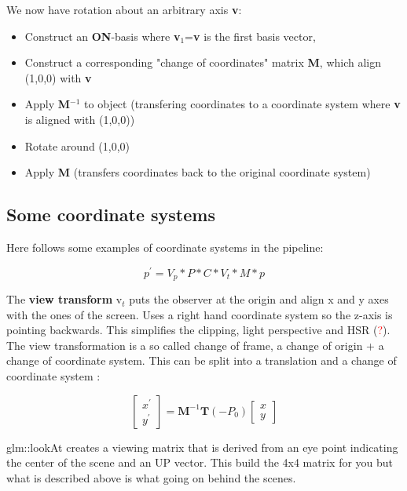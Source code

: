 	\noindent We now have rotation about an arbitrary axis \textbf{v}:

		\begin{itemize}
			\item Construct an \textbf{ON}-basis where \textbf{v}$_1$=\textbf{v} is the first basis vector, 
			\item Construct a corresponding "change of coordinates" matrix \textbf{M}, which align (1,0,0) with \textbf{v}
			\item Apply \textbf{M}$^{-1}$ to object (transfering coordinates to a coordinate system where \textbf{v} is aligned with (1,0,0))
			\item Rotate around (1,0,0)
			\item Apply \textbf{M} (transfers coordinates back to the original coordinate system)
		\end{itemize}

		\subsection*{Some coordinate systems}
		Here follows some examples of coordinate systems in the pipeline:

			\begin{equation}
				p^{\prime} = V_p * P * C * V_t * M * p			
			\end{equation}

		\noindent The \textbf{view transform} v$_t$ puts the observer at the origin and align x and y axes with the ones of the screen. Uses a right hand coordinate system so the z-axis is pointing backwards. This simplifies the clipping, light perspective and HSR (\textcolor{red}{?}). The view transformation is a so called change of frame, a change of origin + a change of coordinate system. This can be split into a translation and a change of coordinate system :

		\begin{equation}
		 	\begin{bmatrix} x^{\prime} \\ y^{\prime} \end{bmatrix}= 
		 	\textbf{M}^{-1}\textbf{T}(-P_0)\begin{bmatrix} x \\ y \end{bmatrix}	
		 \end{equation} 	
		
		\noindent glm::lookAt creates a viewing matrix that is derived from an eye point indicating the center of the scene and an UP vector. This build the 4x4 matrix for you but what is described above is what going on behind the scenes. 

